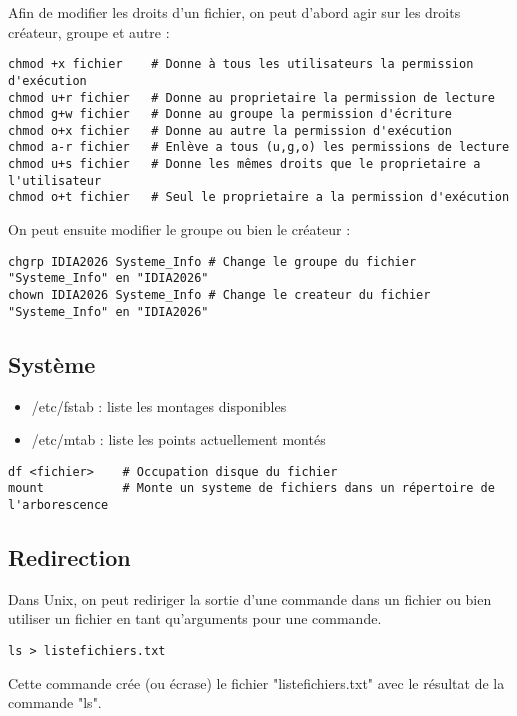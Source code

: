 \documentclass{article}
\begin{document}
Afin de modifier les droits d'un fichier, on peut d'abord agir sur les droits créateur, groupe et autre :

\begin{verbatim}
chmod +x fichier    # Donne à tous les utilisateurs la permission d'exécution
chmod u+r fichier   # Donne au proprietaire la permission de lecture
chmod g+w fichier   # Donne au groupe la permission d'écriture
chmod o+x fichier   # Donne au autre la permission d'exécution
chmod a-r fichier   # Enlève a tous (u,g,o) les permissions de lecture
chmod u+s fichier   # Donne les mêmes droits que le proprietaire a l'utilisateur
chmod o+t fichier   # Seul le proprietaire a la permission d'exécution
\end{verbatim}

On peut ensuite modifier le groupe ou bien le créateur :

\begin{verbatim}
chgrp IDIA2026 Systeme_Info # Change le groupe du fichier "Systeme_Info" en "IDIA2026"
chown IDIA2026 Systeme_Info # Change le createur du fichier "Systeme_Info" en "IDIA2026"
\end{verbatim}

\subsection{Système}
\begin{itemize}
  \item /etc/fstab : liste les montages disponibles
  \item /etc/mtab : liste les points actuellement montés
\end{itemize}
\begin{verbatim}
df <fichier>    # Occupation disque du fichier
mount           # Monte un systeme de fichiers dans un répertoire de l'arborescence
\end{verbatim}

\subsection{Redirection}
Dans Unix, on peut rediriger la sortie d'une commande dans un fichier ou bien utiliser un fichier en tant qu'arguments pour une commande.
\begin{verbatim}
ls > listefichiers.txt
\end{verbatim}

Cette commande crée (ou écrase) le fichier "listefichiers.txt" avec le résultat de la commande "ls".
\end{document}
